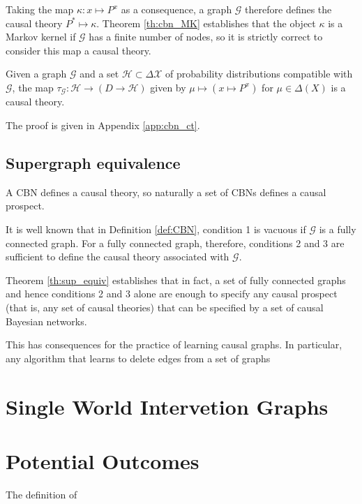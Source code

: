 Taking the map $\kappa: x\mapsto P^x$ as a consequence, a graph $\mathcal{G}$ therefore defines the causal theory $P^*\mapsto \kappa$. Theorem \ref{th:cbn_MK} establishes that the object $\kappa$ is a Markov kernel if $\mathcal{G}$ has a finite number of nodes, so it is strictly correct to consider this map a causal theory.

\begin{theorem}\label{th:cbn_MK}
Given a graph $\mathcal{G}$ and a set $\mathscr{H}\subset\Delta{\mathcal{X}}$ of probability distributions compatible with $\mathcal{G}$, the map $\tau_{\mathcal{G}}:\mathscr{H}\to (D\to \mathscr{H})$ given by $\mu\mapsto (x\mapsto P^x)$ for $\mu\in \Delta(X)$ is a causal theory.
\end{theorem}

The proof is given in Appendix \ref{app:cbn_ct}.

\subsection{Supergraph equivalence}

A CBN defines a causal theory, so naturally a set of CBNs defines a causal prospect. 

It is well known that in Definition \ref{def:CBN}, condition 1 is vacuous if $\mathcal{G}$ is a fully connected graph. For a fully connected graph, therefore, conditions 2 and 3 are sufficient to define the causal theory associated with $\mathcal{G}$. 



Theorem \ref{th:sup_equiv} establishes that in fact, a set of fully connected graphs and hence conditions 2 and 3 alone are enough to specify any causal prospect (that is, any set of causal theories) that can be specified by a set of causal Bayesian networks.

This has consequences for the practice of learning causal graphs. In particular, any algorithm that learns to delete edges from a set of graphs 

\begin{theorem}\label{th:sup_equiv}

\end{theorem}

\section{Single World Intervetion Graphs}

\section{Potential Outcomes}

The definition of 